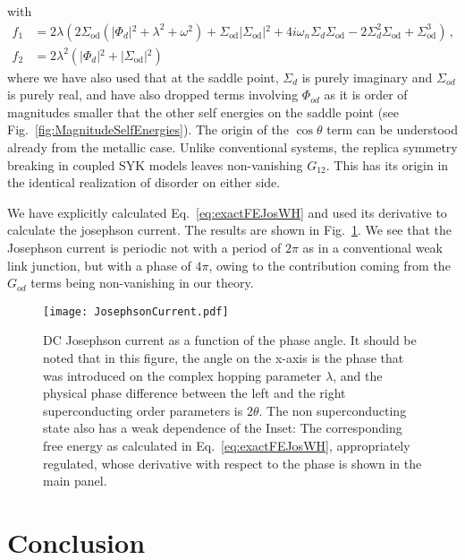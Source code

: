 with 
\begin{align}
    f_1 &= 2 \lambda  \left(2 \Sigma _{\text{od}}\left(\left| \Phi _d\right| {}^2+\lambda ^2+\omega ^2\right)+\Sigma _{\text{od}} \left| \Sigma _{\text{od}}\right|
   {}^2+4 i \omega_n  \Sigma _d \Sigma _{\text{od}}-2 \Sigma _d^2 \Sigma _{\text{od}}+\Sigma _{\text{od}}^3\right) \, ,\\
   f_2 &= 2 \lambda ^2 \left(\left| \Phi _d\right| {}^2+\left| \Sigma _{\text{od}}\right| {}^2\right) \,
\end{align}
where we have also used that at the saddle point, $\Sigma_d$ is purely imaginary and $\Sigma_{od}$ is purely real, and have also dropped terms involving $\Phi_{od}$ as it is order of magnitudes smaller that the other self energies on the saddle point (see Fig.~\ref{fig:MagnitudeSelfEnergies}). 
The origin of the $\cos\theta$ term can be understood already from the metallic case. Unlike conventional systems, the replica symmetry breaking in coupled SYK models leaves non-vanishing $G_{12}$. This has its origin in the identical realization of disorder on either side. 

We have explicitly calculated Eq.~\eqref{eq:exactFEJosWH} and used its derivative to calculate the josephson current. The results are shown in Fig.~\ref{fig:JosephsonCurrent}. We see that the Josephson current is periodic not with a period of $2\pi$ as in a conventional weak link junction, but with a phase of $4\pi$, owing to the contribution coming from the $G_{od}$ terms being non-vanishing in our theory.
\begin{figure}[ht!]
    \centering
    \texttt{[image: JosephsonCurrent.pdf]}
    \caption{DC Josephson current as a function of the phase angle. It should be noted that in this figure, the angle on the x-axis is the phase that was introduced on the complex hopping parameter $\lambda$, and the physical phase difference between the left and the right superconducting order parameters is $2\theta$. The non superconducting state also has a weak dependence of the  Inset: The corresponding free energy as calculated in Eq.~\eqref{eq:exactFEJosWH}, appropriately regulated, whose derivative with respect to the phase is shown in the main panel.}
    \label{fig:JosephsonCurrent}
\end{figure}






\section{Conclusion}
\label{sec:conclusion}


